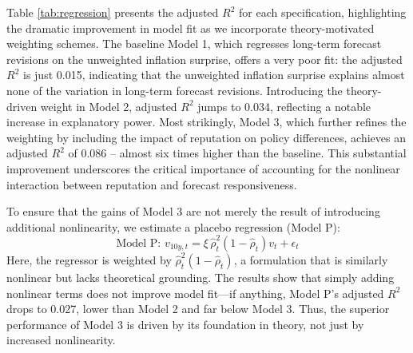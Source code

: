 \documentclass[12pt,letter,leqno]{article}
\theoremstyle{asn}
\theoremstyle{lem}
\theoremstyle{slem}
\theoremstyle{prop}
\theoremstyle{appprop}
\theoremstyle{rem}
\theoremstyle{defn}
\begin{document}
Table \ref{tab:regression} presents the adjusted $R^2$ for each specification, highlighting the dramatic improvement in model fit as we incorporate theory-motivated weighting schemes. The baseline Model 1, which regresses long-term forecast revisions on the unweighted inflation surprise, offers a very poor fit: the adjusted $R^2$ is just 0.015, indicating that the unweighted inflation surprise explains almost none of the variation in long-term forecast revisions. Introducing the theory-driven weight in Model 2, adjusted $R^2$ jumps to 0.034, reflecting a notable increase in explanatory power. Most strikingly, Model 3, which further refines the weighting by including the impact of reputation on policy differences, achieves an adjusted $R^2$ of 0.086 -- almost six times higher than the baseline. This substantial improvement underscores the critical importance of accounting for the nonlinear interaction between reputation and forecast responsiveness.

To ensure that the gains of Model 3 are not merely the result of introducing additional nonlinearity, we estimate a placebo regression (Model P):
\begin{equation}
\text{Model P: }v_{10y,t} = \xi\, \widehat{\rho}_t^2 (1-\widehat{\rho}_t) v_t + \epsilon_t
\end{equation}
Here, the regressor is weighted by $\widehat{\rho}_t^2(1-\widehat{\rho}_t)$, a formulation that is similarly nonlinear but lacks theoretical grounding. The results show that simply adding nonlinear terms does not improve model fit—if anything, Model P's adjusted $R^2$ drops to 0.027, lower than Model 2 and far below Model 3. Thus, the superior performance of Model 3 is driven by its foundation in theory, not just by increased nonlinearity.
\end{document}

